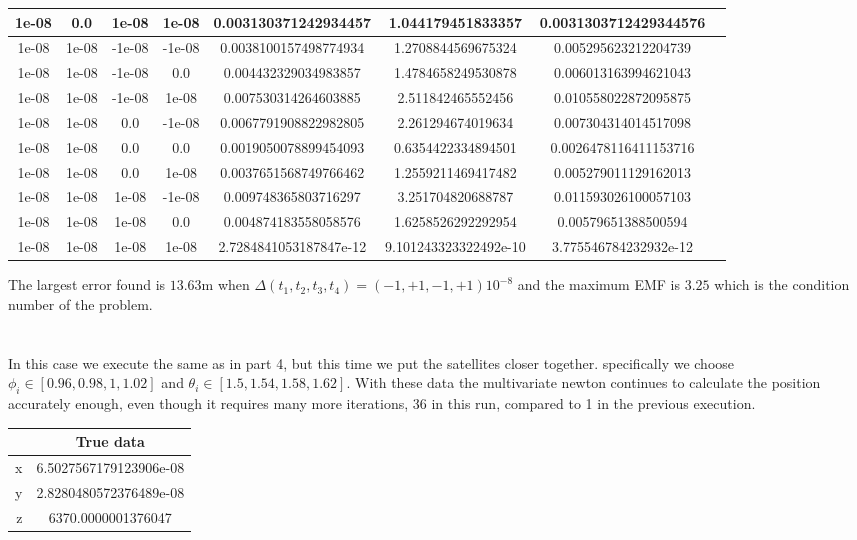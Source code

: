 \documentclass[a4paper]{article}
\begin{document}
\begin{center}
\begin{longtable}{@{}c|@{}c|@{}c|@{}c|@{}c|@{}c|@{}cX@{}}
		1e-08 & 0.0 & 1e-08 & 1e-08 & 0.003130371242934457& 1.044179451833357& 0.0031303712429344576\\ \hline
		1e-08 & 1e-08 & -1e-08 & -1e-08 & 0.0038100157498774934& 1.2708844569675324& 0.005295623212204739\\ \hline
		1e-08 & 1e-08 & -1e-08 & 0.0& 0.004432329034983857& 1.4784658249530878& 0.006013163994621043\\ \hline
		1e-08 & 1e-08 & -1e-08 & 1e-08 & 0.007530314264603885& 2.511842465552456& 0.010558022872095875\\ \hline
		1e-08 & 1e-08 & 0.0 & -1e-08 & 0.0067791908822982805& 2.261294674019634& 0.007304314014517098\\ \hline
		1e-08 & 1e-08 & 0.0 & 0.0& 0.0019050078899454093& 0.6354422334894501& 0.0026478116411153716\\ \hline
		1e-08 & 1e-08 & 0.0 & 1e-08 & 0.0037651568749766462& 1.2559211469417482& 0.005279011129162013\\ \hline
		1e-08 & 1e-08 & 1e-08 & -1e-08 & 0.009748365803716297& 3.251704820688787& 0.011593026100057103\\ \hline
		1e-08 & 1e-08 & 1e-08 & 0.0& 0.004874183558058576& 1.6258526292292954& 0.00579651388500594\\ \hline
		1e-08 & 1e-08 & 1e-08 & 1e-08 & 2.7284841053187847e-12& 9.101243323322492e-10& 3.775546784232932e-12\\ \hline
	\end{longtable}
\end{center}

The largest error found is $13.63$m when $\Delta(t_1, t_2, t_3, t_4) = (-1, +1, -1, +1)10^{-8}$ and the maximum EMF is $3.25$ which is the condition number of the problem.

\section{}

In this case we execute the same as in part 4, but this time we put the satellites closer together. specifically we choose $\phi_i \in [0.96, 0.98, 1, 1.02]$ and $\theta_i \in [1.5, 1.54, 1.58, 1.62]$.
With these data the multivariate newton continues to calculate the position accurately enough, even though it requires many more iterations, 36 in this run, compared to 1 in the previous execution.
\begin{center}
	\begin{tabular}{r | c}
		& True data\\ \hline
		x & 6.5027567179123906e-08\\ \hline
		y & 2.8280480572376489e-08\\ \hline
		z & 6370.0000001376047\\ \hline
	\end{tabular}
\end{center}
\end{document}
